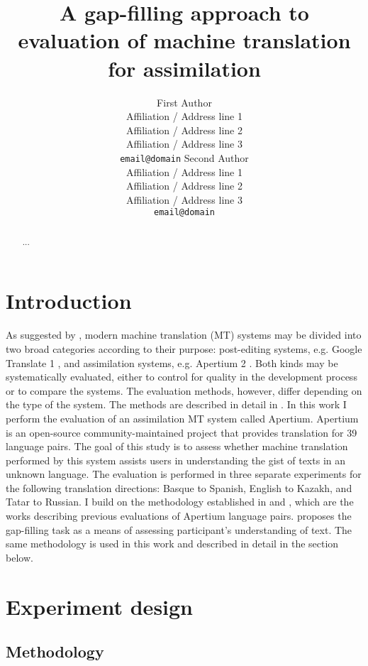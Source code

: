 \documentclass[11pt]{article}
\title{A gap-filling approach to evaluation of machine translation for assimilation}
\author{First Author\\
  Affiliation / Address line 1\\
  Affiliation / Address line 2\\
  Affiliation / Address line 3\\
  {\tt email@domain}  \And
  Second Author\\
  Affiliation / Address line 1\\
  Affiliation / Address line 2\\
  Affiliation / Address line 3\\
  {\tt email@domain}}
\date{}
\begin{document}
\maketitle
\begin{abstract}
   ... 
\end{abstract}

\section{Introduction}

As suggested by , modern machine translation (MT) systems may
be divided into two broad categories according to their purpose: post-editing systems, e.g.
Google Translate 1 , and assimilation systems, e.g. Apertium 2 . Both kinds may be
systematically evaluated, either to control for quality in the development process or to
compare the systems. The evaluation methods, however, differ depending on the type of
the system. The methods are described in detail in .
In this work I perform the evaluation of an assimilation MT system called Apertium.
Apertium is an open-source community-maintained project that provides translation for
39 language pairs. The goal of this study is to assess whether machine translation
performed by this system assists users in understanding the gist of texts in an unknown
language. The evaluation is performed in three separate experiments for the following
translation directions: Basque to Spanish, English to Kazakh, and Tatar to Russian.
I build on the methodology established in  and
, which are the works describing previous evaluations of
Apertium language pairs.  proposes the gap-filling task as a
means of assessing participant’s understanding of text. The same methodology is used in
this work and described in detail in the section below.

\section{Experiment design}

\subsection{Methodology}
\end{document}
